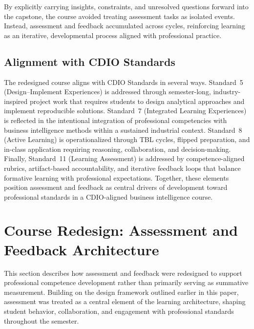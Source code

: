 By explicitly carrying insights, constraints, and unresolved questions forward into the capstone, the course avoided treating assessment tasks as isolated events. Instead, assessment and feedback accumulated across cycles, reinforcing learning as an iterative, developmental process aligned with professional practice.

\subsection{Alignment with CDIO Standards}

The redesigned course aligns with CDIO Standards in several ways. Standard~5 (Design--Implement Experiences) is addressed through semester-long, industry-inspired project work that requires students to design analytical approaches and implement reproducible solutions. Standard~7 (Integrated Learning Experiences) is reflected in the intentional integration of professional competencies with business intelligence methods within a sustained industrial context. Standard~8 (Active Learning) is operationalized through TBL cycles, flipped preparation, and in-class application requiring reasoning, collaboration, and decision-making. Finally, Standard~11 (Learning Assessment) is addressed by competence-aligned rubrics, artifact-based accountability, and iterative feedback loops that balance formative learning with professional expectations.
%
Together, these elements position assessment and feedback as central drivers of development toward professional standards in a CDIO-aligned business intelligence course.

\section{Course Redesign: Assessment and Feedback Architecture}

This section describes how assessment and feedback were redesigned to support professional competence development rather than primarily serving as summative measurement. Building on the design framework outlined earlier in this paper, assessment was treated as a central element of the learning architecture, shaping student behavior, collaboration, and engagement with professional standards throughout the semester.


